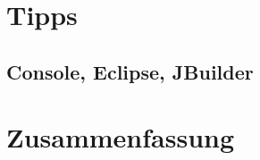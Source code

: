 \frame{\titlepage}
\section[Outline]{}
\frame{\tableofcontents}

\section{Tipps}
\subsection{Console, Eclipse, JBuilder}
\section{Zusammenfassung}
